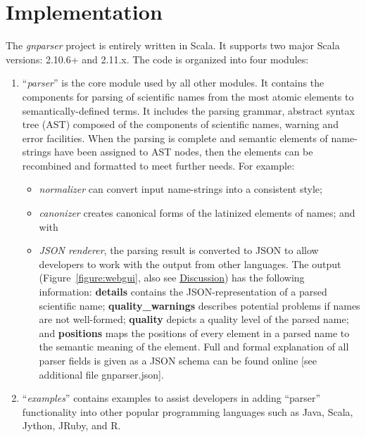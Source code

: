 \documentclass{bmcart}
\begin{document}
\section*{Implementation}

The \textit{gnparser} project is entirely written in Scala. It supports two
major Scala versions: 2.10.6+ and 2.11.x. The code is organized into four
modules:

\begin{enumerate}

  \item ``\textit{parser}'' is the core module used by all other modules. It
    contains the components for parsing of scientific names from the most
    atomic elements to semantically-defined terms. It includes the parsing
    grammar, abstract syntax tree (AST) composed of the components of
    scientific names, warning and error facilities.  When the parsing is
    complete and semantic elements of name-strings have been assigned to AST
    nodes, then the elements can be recombined and formatted to meet further
    needs.  For example:

\begin{itemize}

  \item \textit{normalizer} can convert input name-strings into a consistent
    style;

  \item \textit{canonizer} creates canonical forms of the latinized elements of
    names; and with

  \item \textit{JSON renderer}, the parsing result is converted to JSON
    \cite{bray2014javascript} to allow developers to work with the output from
    other languages. The output (Figure~\ref{figure:webgui}, also see
    \hyperref[sec:discussion]{Discussion}) has the following information: \textbf{details} contains the
    JSON-representation of a parsed scientific name; \textbf{quality\_warnings}
    describes potential problems if names are not well-formed; \textbf{quality}
    depicts a quality level of the parsed name;  and \textbf{positions} maps
    the positions of every element in a parsed name to the semantic meaning of
    the element. Full and formal explanation of all parser fields is given as a
    JSON schema can be found online \cite{gnparser-json} [see additional file
    gnparser.json].

\end{itemize}

  \item ``\textit{examples}'' contains examples to assist developers in adding
    ``parser'' functionality into other popular programming languages such
    as Java, Scala, Jython, JRuby, and R.


\end{enumerate}
\end{document}
